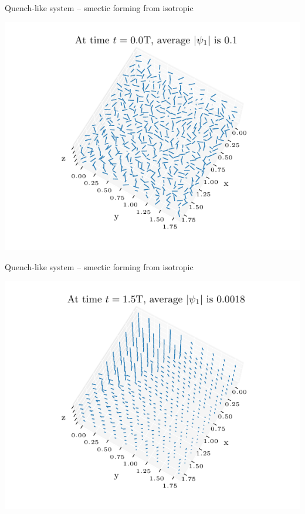 \documentclass[10pt,mathserif]{beamer}
\begin{document}
\begin{frame}[fragile]{Quench-like system -- smectic forming from isotropic}
    \newrefsection
    \begin{center}
        \includegraphics{figures/data_plots/fiso_r7_sample_0.pdf}
    \end{center}
\end{frame}

\begin{frame}[fragile]{Quench-like system -- smectic forming from isotropic}
    \newrefsection
    \begin{center}
        \includegraphics{figures/data_plots/fiso_r7_sample_1.pdf}
    \end{center}
\end{frame}
\end{document}
